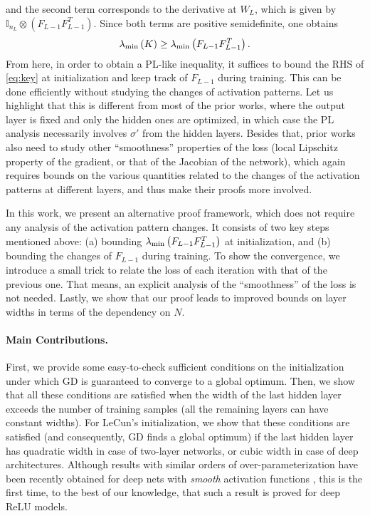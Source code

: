 \documentclass{article}
\newcommand{\Id}{\mathbb{I}}
\newcommand{\evmin}[1]{\lambda_{\rm min}\left(#1\right)}
\begin{document}
and the second term corresponds to the derivative at $W_L$, which is given by $\Id_{n_L} \otimes (F_{L-1}F_{L-1}^T).$
Since both terms are positive semidefinite, one obtains
\begin{align}\label{eq:key}
    \evmin{K}\geq\evmin{F_{L-1}F_{L-1}^T}.
\end{align}
From here, in order to obtain a PL-like inequality, 
it suffices to bound the RHS of \eqref{eq:key} at initialization and keep track of $F_{L-1}$ during training.
This can be done efficiently without studying the changes of activation patterns.
Let us highlight that this is different from most of the prior works, where the output layer is fixed
and only the hidden ones are optimized, in which case the PL analysis necessarily involves $\sigma'$ from the hidden layers.
Besides that, prior works also need to study other ``smoothness'' properties of the loss
(local Lipschitz property of the gradient, or that of the Jacobian of the network),
which again requires bounds on the various quantities related to the changes of the activation patterns at different layers,
and thus make their proofs more involved.

In this work, we present an alternative proof framework, which does not require any analysis of the activation pattern changes.
It consists of two key steps mentioned above:
(a) bounding $\evmin{F_{L-1}F_{L-1}^T}$ at initialization, 
and (b) bounding the changes of $F_{L-1}$ during training. 
To show the convergence, we introduce a small trick to relate the loss of each iteration with that of the previous one.
That means, an explicit analysis of the ``smoothness'' of the loss is not needed.
Lastly, we show that our proof leads to improved bounds on layer widths in terms of the dependency on $N$.

\paragraph{Main Contributions.} 
First, we provide some easy-to-check sufficient conditions on the initialization
under which GD is guaranteed to converge to a global optimum.
Then, we show that all these conditions are satisfied 
when the width of the last hidden layer exceeds the number of training samples (all the remaining layers can have constant widths).
For LeCun's initialization,
we show that these conditions are satisfied (and consequently, GD finds a global optimum)
if the last hidden layer has quadratic width in case of two-layer networks, or cubic width in case of deep architectures.
Although results with similar orders of over-parameterization have been recently obtained
for deep nets with {\em smooth} activation functions \cite{HuangYau2020,QuynhMarco2020},
this is the first time, to the best of our knowledge, that such a result is proved for deep ReLU models.
\end{document}
